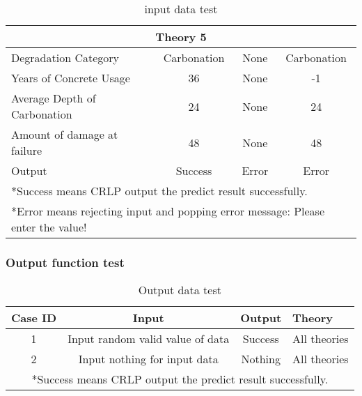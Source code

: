 \documentclass[12pt, titlepage]{article}
\begin{document}
\begin{table}
\begin{adjustbox}{width=\textwidth}
\begin{tabularx}{\textwidth}{|X|c|c|c|}
    \hline
        \multicolumn{4}{|c|}{Theory 5} \\ 
    \hline
       Degradation Category & Carbonation & None & Carbonation\\
    \hline
       Years of Concrete Usage & 36 & None & -1\\
    \hline
        Average Depth of Carbonation& 24 & None & 24\\
    \hline
        Amount of damage at failure& 48 & None & 48\\
    \hline
        Output & Success & Error & Error \\
    \hline
    \multicolumn{4}{p{\dimexpr\textwidth-2\tabcolsep\relax}}{*Success means CRLP output the predict result successfully.} \\
    \multicolumn{4}{p{\dimexpr\textwidth-2\tabcolsep\relax}}{*Error means rejecting input and popping error message: Please enter the value!} \\
    \end{tabularx}
    \end{adjustbox}
    \caption{input data test}
    \label{tab:inputtest}
\end{table}

\newpage
\subsubsection{Output function test}

\begin{table}
    \centering
    \begin{adjustbox}{width=\textwidth}
    \begin{tabularx}{\textwidth}{|c|c|c|X|} %
    \hline
        Case ID & Input & Output & Theory\\
    \hline
        1 & Input random valid value of data & Success & All theories\\
    \hline
        2 & Input nothing for input data & Nothing & All theories\\
    \hline
    \multicolumn{4}{p{\dimexpr\textwidth-2\tabcolsep\relax}}{*Success means CRLP output the predict result successfully.} \\
    \end{tabularx}
    \end{adjustbox}
    \caption{Output data test}
    \label{tab:outputtest}
\end{table}
\end{document}
